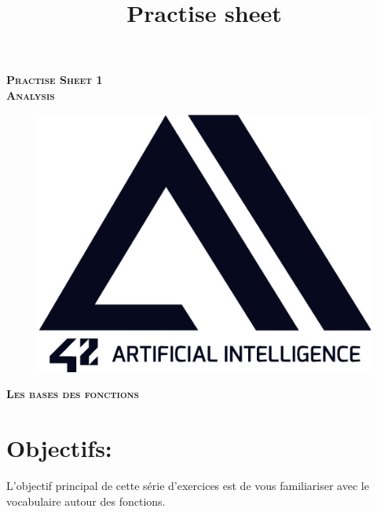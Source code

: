 \documentclass[11pt, french]{article}
\author{} %
\title{Practise sheet}
\begin{document}
\vspace*{2cm}
\begin{center}
    \textsc{\fontsize{40}{48} \bfseries Practise Sheet 1}\\[0.6cm]
    \textsc{\fontsize{40}{48} \bfseries Analysis}\\[0.3cm]
\end{center}
\vspace{3cm}

\begin{figure}[!h]
\center
\includegraphics[scale=0.5]{logo-42-ai.png}
\label{fig:1st_page_logo_42ai}
\end{figure}

\vspace*{2cm}
\begin{center}
    \textsc{\fontsize{32}{48} \bfseries Les bases des fonctions}\\[0.6cm]
\end{center}
\vspace{3cm}

\newpage



\section*{Objectifs:}
L'objectif principal de cette série d'exercices est de vous familiariser avec le vocabulaire autour des fonctions.
\end{document}
